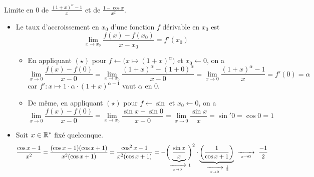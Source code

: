 \documentclass{article}
\begin{document}
\begin{question_kholle}{Limite en $0$ de $\displaystyle\frac{(1+x)^{\alpha}-1}{x}$ et de $\displaystyle\frac{1-\cos x}{x^2}$.}
	\;\\
	\begin{itemize}[label=$*$]
		\item Le taux d'accroissement en $x_0$ d'une fonction $f$ dérivable en $x_0$ est
		      \[\tag{$\star$}
			      \lim_{x\to x_0}\frac{f(x)-f(x_0)}{x-x_0}=f'(x_0)
		      \]
		      \begin{itemize}
			      \item En appliquant $(\star)$ pour $f\leftarrow \bigl(x\mapsto (1+x)^{\alpha}\bigr)$ et $x_0\leftarrow 0$, on a
			            \[
				            \lim_{x\to 0}\frac{f(x)-f(0)}{x-0}=\lim_{x\to x_0}\frac{(1+x)^{\alpha}-(1+0)^{\alpha}}{x-0} = \lim_{x\to 0}\frac{(1+x)^{\alpha}-1}{x}=f'(0)=\alpha
			            \]
			            car $f': x\mapsto 1\cdot \alpha\cdot (1+x)^{\alpha - 1}$ vaut $\alpha$ en $0$.
			      \item De même, en appliquant $(\star)$ pour $f\leftarrow \sin$ et $x_0\leftarrow 0$, on a
			            \[
				            \lim_{x\to 0}\frac{f(x)-f(0)}{x-0}=\lim_{x\to x_0}\frac{\sin x-\sin 0}{x-0} = \lim_{x\to 0}\frac{\sin x}{x}=\sin' 0=\cos 0=1
			            \]
		      \end{itemize}
		\item Soit $x\in\mathbb R^*$ fixé quelconque.
		      \[
			      \frac{\cos x - 1}{x^2} = \frac{(\cos x-1)(\cos x+1)}{x^2(\cos x+1)} = \frac{\cos^2 x-1}{x^2(\cos x+1)}=-\biggl(\!\!\!\smash{\underbrace{\frac{\sin x}{x}}_{\ \xrightarrow[\;x \to 0\;]{}\ 1}}\!\!\!\biggr)^2\cdot\underbrace{\left(\frac{1}{\cos x+1}\right)}_{\ \xrightarrow[\;x \to 0\;]{}\ \frac{1}{2}} \ \xrightarrow[\;x \to 0\;]{}\ \frac{-1}{2}
		      \]
	\end{itemize}
\end{question_kholle}
\end{document}
